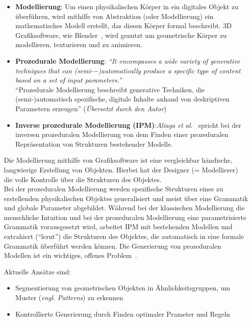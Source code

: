 \documentclass[11pt]{article}
\begin{document}
    \begin{itemize}
        \item \textbf{Modellierung}: Um einen physikalischen Körper in ein digitales Objekt zu überführen, wird mithilfe
        von Abstraktion (oder Modellierung) ein mathematisches Modell erstellt, das diesen Körper formal beschreibt.
        3D Grafiksoftware, wie Blender~\cite{blender}, wird genutzt um geometrische Körper zu modellieren, texturieren
        und zu animieren.
        \item \textbf{Prozedurale Modellierung}: \textit{"`It encompasses a wide variety of generative techniques that
        can (semi-−)automatically produce a specific type of content based on a set of input
        parameters."'}~\cite{1} \\
        "`Prozedurale Modellierung beschreibt generative Techniken, die \\(semi-)automatisch spezifische, digitale
        Inhalte anhand von deskriptiven Parametern erzeugen"' (\textit{Übersetzt durch den Autor})
        \item \textbf{Inverse prozedurale Modellierung (IPM)}:\textit{Aliaga et al.}~\cite{2}
        spricht bei der inversen prozeduralen Modellierung von dem Finden einer prozeduralen Repräsentation von
        Strukturen bestehender Modelle.
    \end{itemize}
    Die Modellierung mithilfe von Grafiksoftware ist eine vergleichbar händische, langwierige Erstellung von
    Objekten.
    Hierbei hat der Designer (= Modellierer) die volle Kontrolle über die Strukturen des Objektes.\\
    Bei der prozeduralen Modellierung werden spezifische Strukturen eines zu erstellenden physikalischen Objektes
    generalisiert und meist über eine Grammatik und globale Parameter abgebildet.
    Während bei der klassischen Modellierung die menschliche Intuition und bei der prozeduralen Modellierung eine
    parametrisierte Grammatik vorausgesetzt wird, arbeitet IPM mit bestehenden Modellen und extrahiert ("`lernt"')
    die Strukturen des Objektes, die automatisch in eine formale Grammatik überführt werden können.
    Die Generierung von prozeduralen Modellen ist ein wichtiges, offenes Problem~\cite{2}.

    \newpage

    Aktuelle Ansätze sind:
    \begin{itemize}
        \item Segmentierung von geometrischen Objekten in Ähnlichkeitsgruppen, um Muster (\textit{engl. Patterns}) zu
        erkennen
        \item Kontrollierte Generierung durch Finden optimaler Prameter und Regeln
    \end{itemize}
\end{document}
